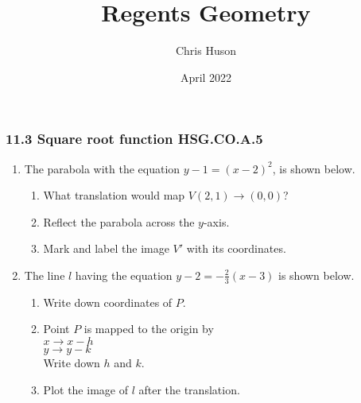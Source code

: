 \documentclass[12pt, twoside]{article}
\title{Regents Geometry}
\author{Chris Huson}
\date{April 2022}
\begin{document}
\subsubsection*{11.3 Square root function \hfill HSG.CO.A.5}
\begin{enumerate}
\item The parabola with the equation $y-1=(x-2)^2$, is shown below. 
\begin{multicols}{2}
  \begin{enumerate}
    \item What translation would map $V(2,1) \rightarrow (0,0)$?\vspace{2cm}
    \item Reflect the parabola across the $y$-axis.
    \item Mark and label the image $V'$ with its coordinates. \vspace{2cm}
  \end{enumerate}
  \begin{flushright}
\end{flushright}
\end{multicols}

\item The line $l$ having the equation $\displaystyle y-2=-\frac{2}{3}(x-3)$ is shown below.
\begin{multicols}{2}
  \begin{enumerate}
    \item Write down coordinates of $P$.
    \item Point $P$ is mapped to the origin by\\ $x \rightarrow x-h$\\ $y \rightarrow y-k$ \\Write down $h$ and $k$.
    \item Plot the image of $l$ after the translation.
  \end{enumerate}
  \begin{flushright}
  \end{flushright}
\end{multicols}%


\end{enumerate}
\end{document}
